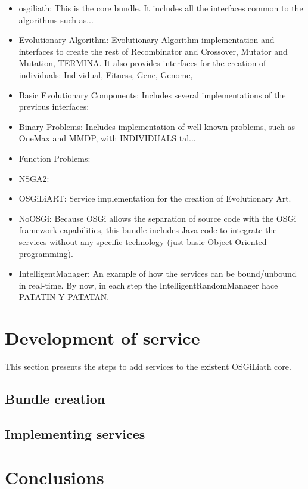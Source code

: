\documentclass{sig-alternate}
\begin{document}
\begin{itemize}
\item osgiliath: This is the core bundle. It includes all the interfaces common to the algorithms such as...
\item Evolutionary Algorithm: Evolutionary Algorithm implementation and interfaces to create the rest of Recombinator and Crossover, Mutator and Mutation, TERMINA. It also provides interfaces for the creation of individuals: Individual, Fitness, Gene, Genome, 
\item Basic Evolutionary Components: Includes several implementations of the previous interfaces: 
\item Binary Problems: Includes implementation of well-known problems, such as OneMax and MMDP, with INDIVIDUALS tal...
\item Function Problems: 
\item NSGA2: 
\item OSGiLiART: Service implementation for the creation of Evolutionary Art.
\item NoOSGi: Because OSGi allows the separation of source code with the OSGi framework capabilities, this bundle includes Java code to integrate the services without any specific technology (just basic Object Oriented programming).
\item IntelligentManager: An example of how the services can be bound/unbound in real-time. By now, in each step the IntelligentRandomManager hace PATATIN Y PATATAN.
\end{itemize}

\section{Development of service}
\label{sec:development}
This section presents the steps to add services to the existent OSGiLiath core.

\subsection{Bundle creation}

\subsection{Implementing services}



\section{Conclusions}
\end{document}
